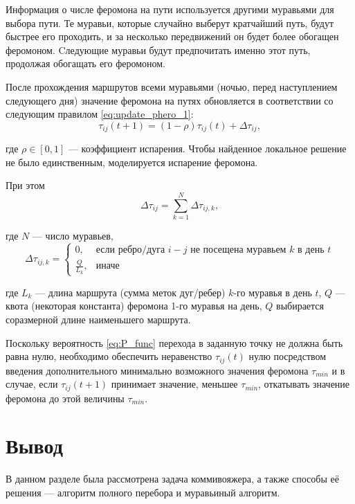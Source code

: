 Информация о числе феромона на пути используется другими муравьями для выбора пути. 
Те муравьи, которые случайно выберут кратчайший путь, будут быстрее его проходить, и за несколько передвижений он будет более обогащен феромоном. 
Cледующие муравьи будут предпочитать именно этот путь, продолжая обогащать его феромоном. 

После прохождения маршрутов всеми муравьями (ночью, перед наступлением следующего дня) значение феромона на путях обновляется в соответствии со следующим правилом \eqref{eq:update_phero_1}:
\begin{equation}
	\label{eq:update_phero_1}
	\tau_{ij}(t+1) = (1-\rho)\tau_{ij}(t) + \Delta \tau_{ij},
\end{equation}

где $\rho \in [0, 1]$ --- коэффициент испарения. 
Чтобы найденное локальное решение не было единственным, моделируется испарение феромона.

При этом
\begin{equation}
	\label{update_phero_2}
	\Delta \tau_{ij} = \sum_{k=1}^N \Delta\tau_{ij, k},
\end{equation}

где $N$ --- число муравьев,
\begin{equation}
	\label{update_phero_3}
	\Delta\tau_{ij,k} = 
	\begin{cases}
		0,  & \textrm{если ребро/дуга $i-j$ не посещена муравьем $k$ в день $t$} \\
		\frac{Q}{L_{k}}, & \textrm{иначе} 
	\end{cases}
\end{equation}

где $L_{k}$ --- длина маршрута (сумма меток дуг/ребер) $k$-го муравья в день $t$, $Q$ --- квота (некоторая константа) феромона 1-го муравья на день, $Q$ выбирается соразмерной длине наименьшего маршрута.

Поскольку вероятность \ref{eq:P_func} перехода в заданную точку не должна быть равна нулю, необходимо обеспечить неравенство $\tau_{ij}(t)$ нулю посредством введения дополнительного минимально возможного значения феромона $\tau_{min}$  и в случае, если $\tau_{ij}(t+1)$ принимает значение, меньшее $\tau_{min}$, откатывать значение феромона до этой величины $\tau_{min}$.

\section*{Вывод}

В данном разделе была рассмотрена задача коммивояжера, а также способы её решения --- алгоритм полного перебора и муравьиный алгоритм.
